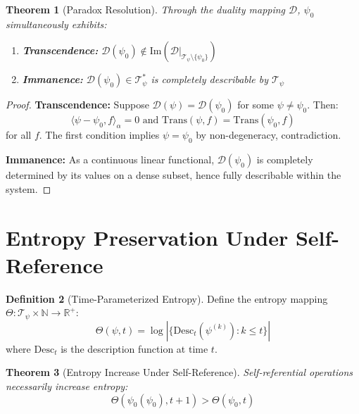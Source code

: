 \documentclass[12pt]{article}
\theoremstyle{plain}
\newtheorem{theorem}{Theorem}[section]
\theoremstyle{definition}
\newtheorem{definition}[theorem]{Definition}
\begin{document}
\begin{theorem}[Paradox Resolution]
\label{thm:paradox-resolution}
Through the duality mapping $\mathcal{D}$, $\psi_0$ simultaneously exhibits:
\begin{enumerate}
\item \textbf{Transcendence:} $\mathcal{D}(\psi_0) \notin \text{Im}(\mathcal{D}|_{\mathcal{T}_\psi \setminus \{\psi_0\}})$
\item \textbf{Immanence:} $\mathcal{D}(\psi_0) \in \mathcal{T}_\psi^*$ is completely describable by $\mathcal{T}_\psi$
\end{enumerate}
\end{theorem}

\begin{proof}
\textbf{Transcendence:} Suppose $\mathcal{D}(\psi) = \mathcal{D}(\psi_0)$ for some $\psi \neq \psi_0$. Then:
$$\langle \psi - \psi_0, f \rangle_\alpha = 0 \text{ and } \text{Trans}(\psi, f) = \text{Trans}(\psi_0, f)$$
for all $f$. The first condition implies $\psi = \psi_0$ by non-degeneracy, contradiction.

\textbf{Immanence:} As a continuous linear functional, $\mathcal{D}(\psi_0)$ is completely determined by its values on a dense subset, hence fully describable within the system.
\end{proof}

\section{Entropy Preservation Under Self-Reference}

\begin{definition}[Time-Parameterized Entropy]
Define the entropy mapping $\Theta: \mathcal{T}_\psi \times \mathbb{N} \to \mathbb{R}^+$:
$$\Theta(\psi, t) = \log |\{\text{Desc}_t(\psi^{(k)}) : k \leq t\}|$$
where $\text{Desc}_t$ is the description function at time $t$.
\end{definition}

\begin{theorem}[Entropy Increase Under Self-Reference]
\label{thm:entropy-self-reference}
Self-referential operations necessarily increase entropy:
$$\Theta(\psi_0(\psi_0), t+1) > \Theta(\psi_0, t)$$
\end{theorem}
\end{document}
